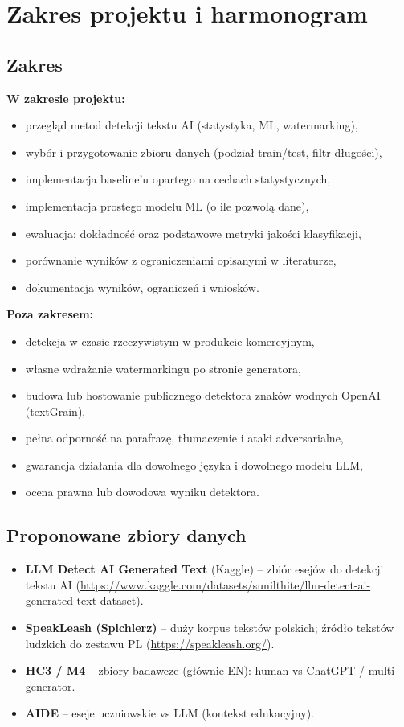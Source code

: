 \section{Zakres projektu i harmonogram}

\subsection{Zakres}

\textbf{W zakresie projektu:}
\begin{itemize}
	\item przegląd metod detekcji tekstu AI (statystyka, ML, watermarking),
	\item wybór i przygotowanie zbioru danych (podział train/test, filtr długości),
	\item implementacja baseline'u opartego na cechach statystycznych,
	\item implementacja prostego modelu ML (o ile pozwolą dane),
	\item ewaluacja: dokładność oraz podstawowe metryki jakości klasyfikacji,
	\item porównanie wyników z ograniczeniami opisanymi w literaturze,
	\item dokumentacja wyników, ograniczeń i wniosków.
\end{itemize}

\textbf{Poza zakresem:}
\begin{itemize}
	\item detekcja w czasie rzeczywistym w produkcie komercyjnym,
	\item własne wdrażanie watermarkingu po stronie generatora,
	\item budowa lub hostowanie publicznego detektora znaków wodnych OpenAI (textGrain),
	\item pełna odporność na parafrazę, tłumaczenie i ataki adversarialne,
	\item gwarancja działania dla dowolnego języka i dowolnego modelu LLM,
	\item ocena prawna lub dowodowa wyniku detektora.
\end{itemize}

\subsection{Proponowane zbiory danych}

\begin{itemize}
	\item \textbf{LLM Detect AI Generated Text} (Kaggle) -- zbiór esejów do detekcji tekstu AI
	(\url{https://www.kaggle.com/datasets/sunilthite/llm-detect-ai-generated-text-dataset}).
	\item \textbf{SpeakLeash (Spichlerz)} -- duży korpus tekstów polskich; źródło tekstów ludzkich do zestawu PL
	(\url{https://speakleash.org/}).
	\item \textbf{HC3 / M4} -- zbiory badawcze (głównie EN): human vs ChatGPT / multi-generator.
	\item \textbf{AIDE} -- eseje uczniowskie vs LLM (kontekst edukacyjny).
\end{itemize}


